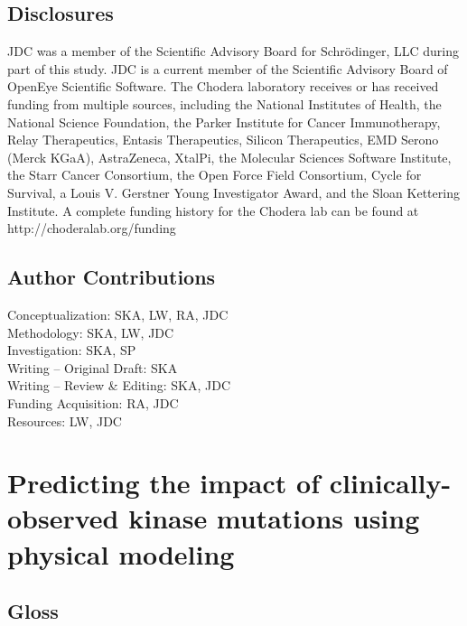 \documentclass[phd,tocprelim]{cornell}
\begin{document}

\section{Disclosures}

JDC was a member of the Scientific Advisory Board for Schrödinger, LLC during part of this study.
JDC is a current member of the Scientific Advisory Board of OpenEye Scientific Software.
The Chodera laboratory receives or has received funding from multiple sources, including the National Institutes of Health, the National Science Foundation, the Parker Institute for Cancer Immunotherapy, Relay Therapeutics, Entasis Therapeutics, Silicon Therapeutics, EMD Serono (Merck KGaA), AstraZeneca, XtalPi, the Molecular Sciences Software Institute, the Starr Cancer Consortium, the Open Force Field Consortium, Cycle for Survival, a Louis V. Gerstner Young Investigator Award, and the Sloan Kettering Institute.
A complete funding history for the Chodera lab can be found at http://choderalab.org/funding


\section{Author Contributions}
Conceptualization: SKA, LW, RA, JDC \\
Methodology: SKA, LW, JDC\\
Investigation: SKA, SP\\
Writing -- Original Draft: SKA\\
Writing -- Review \& Editing: SKA, JDC \\
Funding Acquisition: RA, JDC\\
Resources: LW, JDC\\


\chapter{Predicting the impact of clinically-observed kinase mutations using physical modeling}

\section{Gloss}
\end{document}
